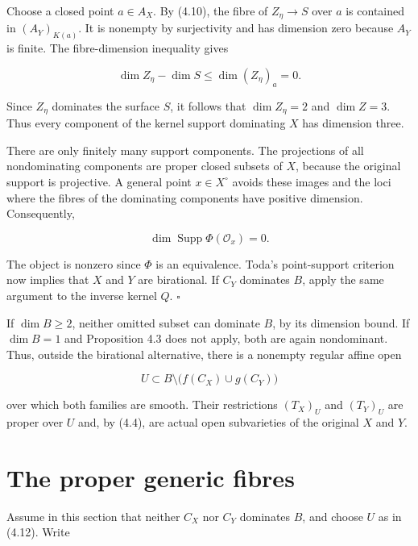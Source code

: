 \documentclass[11pt,a4paper]{article}
\begin{document}
Choose a closed point $a\in A_X$. By (4.10), the fibre of $Z_\eta\to S$ over $a$ is contained in $(A_Y)_{K(a)}$. It is nonempty by surjectivity and has dimension zero because $A_Y$ is finite. The fibre-dimension inequality gives

\begin{equation*}
\dim Z_\eta-\dim S
\leq\dim (Z_\eta)_a=0.
\end{equation*}

Since $Z_\eta$ dominates the surface $S$, it follows that $\dim Z_\eta=2$ and $\dim Z=3$. Thus every component of the kernel support dominating $X$ has dimension three.

There are only finitely many support components. The projections of all nondominating components are proper closed subsets of $X$, because the original support is projective. A general point $x\in X^\circ$ avoids these images and the loci where the fibres of the dominating components have positive dimension. Consequently,

\begin{equation*}
\dim\operatorname{Supp}\Phi(\mathcal O_x)=0.
\end{equation*}

The object is nonzero since $\Phi$ is an equivalence. Toda's point-support criterion \cite[Lemma 7.3]{Tod06} now implies that $X$ and $Y$ are birational. If $C_Y$ dominates $B$, apply the same argument to the inverse kernel $Q$. $\square$

If $\dim B\geq2$, neither omitted subset can dominate $B$, by its dimension bound. If $\dim B=1$ and Proposition 4.3 does not apply, both are again nondominant. Thus, outside the birational alternative, there is a nonempty regular affine open

\begin{equation*}
U\subset B\setminus\bigl(f(C_X)\cup g(C_Y)\bigr)
\tag{4.12}
\end{equation*}

over which both families are smooth. Their restrictions $(T_X)_U$ and $(T_Y)_U$ are proper over $U$ and, by (4.4), are actual open subvarieties of the original $X$ and $Y$.

\section{The proper generic fibres}

Assume in this section that neither $C_X$ nor $C_Y$ dominates $B$, and choose $U$ as in (4.12). Write
\end{document}
